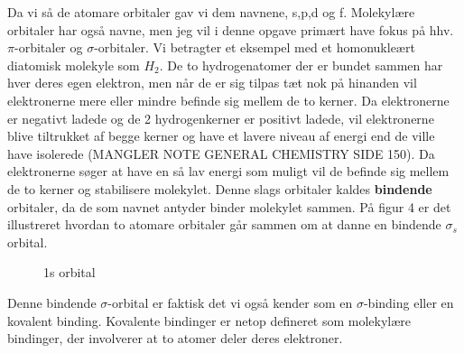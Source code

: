 \documentclass[12pt,a4paper]{article}
\theoremstyle{break}
\theoremstyle{nonumberplain}
\begin{document}
Da vi så de atomare orbitaler gav vi dem navnene, s,p,d og f. Molekylære orbitaler har også navne, men jeg vil i denne opgave primært have fokus på hhv. $\pi$-orbitaler og $\sigma$-orbitaler. Vi betragter et eksempel med et homonukleært diatomisk molekyle som $H_2$. De to hydrogenatomer der er bundet sammen har hver deres egen elektron, men når de er sig tilpas tæt nok på hinanden vil elektronerne mere eller mindre befinde sig mellem de to kerner. Da elektronerne er negativt ladede og de 2 hydrogenkerner er positivt ladede, vil elektronerne blive tiltrukket af begge kerner og have et lavere niveau af energi end de ville have isolerede (MANGLER NOTE GENERAL CHEMISTRY SIDE 150). Da elektronerne søger at have en så lav energi som muligt vil de befinde sig mellem de to kerner og stabilisere molekylet. Denne slags orbitaler kaldes \textbf{bindende} orbitaler, da de som navnet antyder binder molekylet sammen. På figur 4 er det illustreret hvordan to atomare orbitaler går sammen om at danne en bindende $\sigma_s$ orbital. 
\begin{center}
\begin{figure}[ht!]
  \centering
  \caption{1s orbital} \end{figure}
	\end{center}
	
Denne bindende $\sigma$-orbital er faktisk det vi også kender som en $\sigma$-binding eller en kovalent binding. Kovalente bindinger er netop defineret som molekylære bindinger, der involverer at to atomer deler deres elektroner. 
	
\end{document}
